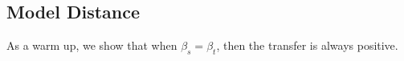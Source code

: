 


\subsection{Model Distance}

As a warm up, we show that when $\beta_s = \beta_t$, then the transfer is always positive.

